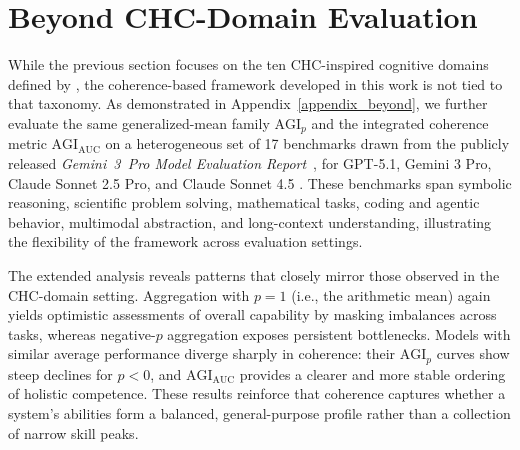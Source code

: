 \documentclass{article}
\begin{document}


\section{Beyond CHC-Domain Evaluation}
\label{beyond_chc_summary}

While the previous section focuses on the ten CHC-inspired cognitive domains defined by \citet{hendrycks2025agidefinition}, the coherence-based framework developed in this work is not tied to that taxonomy. As demonstrated in Appendix~\ref{appendix_beyond}, we further evaluate the same generalized-mean family $\mathrm{AGI}_p$ and the integrated coherence metric $\mathrm{AGI}_{\mathrm{AUC}}$ on a heterogeneous set of 17 benchmarks drawn from the publicly released \emph{Gemini~3~Pro Model Evaluation Report}~\citep{deepmind2025gemini3pro}, for GPT-5.1, Gemini 3 Pro, Claude Sonnet 2.5 Pro, and Claude Sonnet 4.5 \citep{claude_sonnet4_5}. These benchmarks span symbolic reasoning, scientific problem solving, mathematical tasks, coding and agentic behavior, multimodal abstraction, and long-context understanding, illustrating the flexibility of the framework across evaluation settings.

The extended analysis reveals patterns that closely mirror those observed in the CHC-domain setting. Aggregation with $p = 1$ (i.e., the arithmetic mean) again yields optimistic assessments of overall capability by masking imbalances across tasks, whereas negative-$p$ aggregation exposes persistent bottlenecks. Models with similar average performance diverge sharply in coherence: their $\mathrm{AGI}_p$ curves show steep declines for $p < 0$, and $\mathrm{AGI}_{\mathrm{AUC}}$ provides a clearer and more stable ordering of holistic competence. These results reinforce that coherence captures whether a system’s abilities form a balanced, general-purpose profile rather than a collection of narrow skill peaks.
\end{document}
